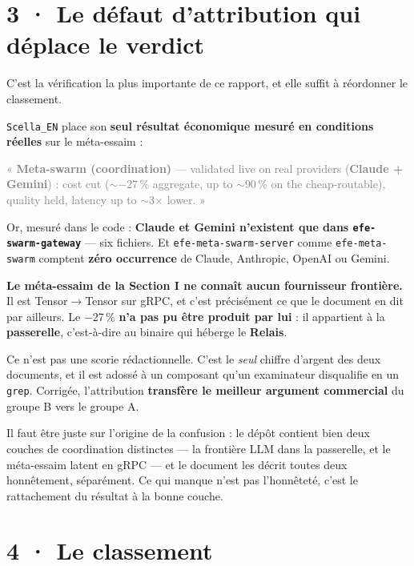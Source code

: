 \documentclass[10pt]{article}
\newcommand{\sz}[1]{\textcolor{grey}{\small\textsf{#1}}}
\newcommand{\code}[1]{\texttt{\small #1}}
\newcommand{\x}{$\times$}
\newcommand{\pc}{\,\%}
\begin{document}
\section{3 · Le défaut d'attribution qui déplace le verdict}

C'est la vérification la plus importante de ce rapport, et elle suffit à réordonner le classement.

\code{Scella\_EN} place son \textbf{seul résultat économique mesuré en conditions réelles} sur le
méta-essaim :

\begin{extrait}
\sz{« \textbf{Meta-swarm (coordination)} --- validated live on real providers (\textbf{Claude + Gemini}) :
cost cut ($\sim$$-$27\pc{} aggregate, up to $\sim$90\pc{} on the cheap-routable), quality held, latency up
to $\sim$3\x{} lower. »}
\end{extrait}

Or, mesuré dans le code : \textbf{Claude et Gemini n'existent que dans \code{efe-swarm-gateway}} ---
six fichiers. Et \code{efe-meta-swarm-server} comme \code{efe-meta-swarm} comptent \textbf{zéro
occurrence} de Claude, Anthropic, OpenAI ou Gemini.

\begin{alerte}
\textbf{Le méta-essaim de la Section I ne connaît aucun fournisseur frontière.} Il est
Tensor$\rightarrow$Tensor sur gRPC, et c'est précisément ce que le document en dit par ailleurs. Le
$-$27\pc{} \textbf{n'a pas pu être produit par lui} : il appartient à la \textbf{passerelle}, c'est-à-dire
au binaire qui héberge le \textbf{Relais}.

Ce n'est pas une scorie rédactionnelle. C'est le \emph{seul} chiffre d'argent des deux documents, et il
est adossé à un composant qu'un examinateur disqualifie en un \code{grep}. Corrigée, l'attribution
\textbf{transfère le meilleur argument commercial} du groupe B vers le groupe A.
\end{alerte}

Il faut être juste sur l'origine de la confusion : le dépôt contient bien deux couches de coordination
distinctes --- la frontière LLM dans la passerelle, et le méta-essaim latent en gRPC --- et le document
les décrit toutes deux honnêtement, séparément. Ce qui manque n'est pas l'honnêteté, c'est le
rattachement du résultat à la bonne couche.

\section{4 · Le classement}
\end{document}
